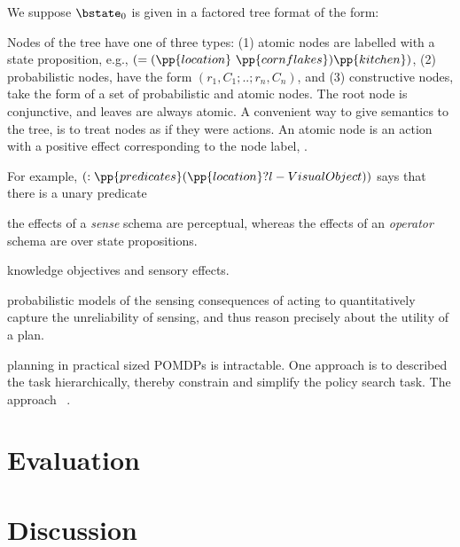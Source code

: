 \documentclass[letterpaper]{article}
\begin{document}
We suppose $\bstate_0$ is given in a factored tree format of the
form:




\noindent Nodes of the tree have one of three types: (1) atomic nodes
are labelled with a state proposition, e.g., $(=
(\pp{location}~\pp{cornflakes}) \pp{kitchen})$, (2) probabilistic
nodes, have the form $(r_1, C_1;..;r_n, C_n)$, and (3) constructive
nodes, take the form of a set of probabilistic and atomic nodes. The
root node is conjunctive, and leaves are always atomic. A convenient
way to give semantics to the tree, is to treat nodes as if they were
actions. An atomic node is an action with a positive effect
corresponding to the node label, .
















For example, $(:\pp{predicates} (\pp{location} ?l - VisualObject))$
says that there is a unary predicate 




the effects of a {\em sense} schema are perceptual, whereas the
effects of an {\em operator} schema are over state propositions.


knowledge objectives and  sensory effects. 


probabilistic models of the sensing consequences of acting to
quantitatively capture the unreliability of sensing, and thus reason
precisely about the utility of a plan. 


planning in practical sized POMDPs is intractable. One approach is to
described the task hierarchically, thereby constrain and simplify the
policy search task. The approach ~\cite{}. 

\section{Evaluation}


\section{Discussion}
\end{document}
